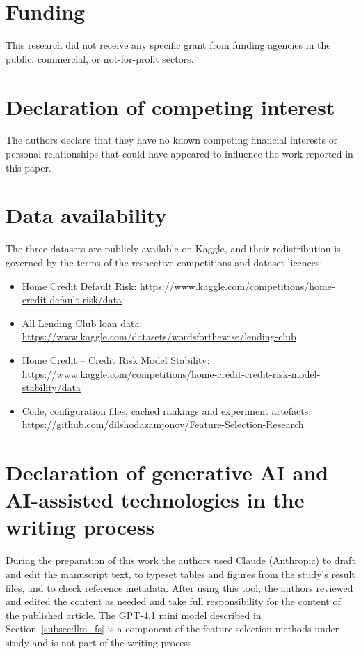 \documentclass[final,5p,twocolumn]{elsarticle}
\begin{document}
\section*{Funding}
This research did not receive any specific grant from funding agencies in the public, commercial, or not-for-profit sectors.

\section*{Declaration of competing interest}
The authors declare that they have no known competing financial interests or personal relationships that could have appeared to influence the work reported in this paper.

\section*{Data availability}
The three datasets are publicly available on Kaggle, and their redistribution is governed by the terms of the respective competitions and dataset licences:
\begin{itemize}
    \item Home Credit Default Risk: \url{https://www.kaggle.com/competitions/home-credit-default-risk/data}
    \item All Lending Club loan data: \url{https://www.kaggle.com/datasets/wordsforthewise/lending-club}
    \item Home Credit -- Credit Risk Model Stability: \url{https://www.kaggle.com/competitions/home-credit-credit-risk-model-stability/data}
    \item Code, configuration files, cached rankings and experiment artefacts: \url{https://github.com/dilshodazamjonov/Feature-Selection-Research}
\end{itemize}

\section*{Declaration of generative AI and AI-assisted technologies in the writing process}
During the preparation of this work the authors used Claude (Anthropic) to draft and edit the manuscript text, to typeset tables and figures from the study's result files, and to check reference metadata. After using this tool, the authors reviewed and edited the content as needed and take full responsibility for the content of the published article. The GPT-4.1 mini model described in Section~\ref{subsec:llm_fs} is a component of the feature-selection methods under study and is not part of the writing process.
\end{document}
